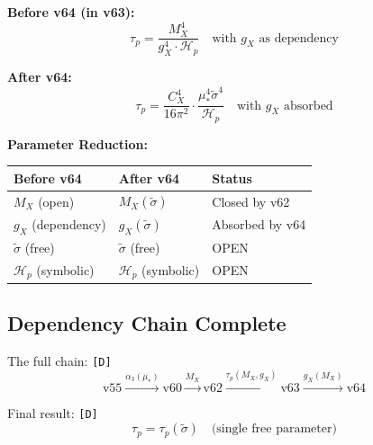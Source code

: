 \documentclass[11pt,a4paper]{article}
\newcommand{\tagD}{\textcolor{green!50!black}{\texttt{[D]}}}
\theoremstyle{definition}
\begin{document}
\begin{canonbox}
\textbf{Before v64 (in v63):}
\begin{equation}
\label{eq:before-v64}
\tau_p = \frac{M_X^4}{g_X^4 \cdot \mathcal{H}_p} \quad \text{with } g_X \text{ as dependency}
\end{equation}

\textbf{After v64:}
\begin{equation}
\label{eq:after-v64}
\tau_p = \frac{C_X^4}{16\pi^2} \cdot \frac{\mu_*^4 \tilde{\sigma}^4}{\mathcal{H}_p} \quad \text{with } g_X \text{ absorbed}
\end{equation}

\textbf{Parameter Reduction:}
\begin{center}
\begin{tabular}{lll}
\toprule
Before v64 & After v64 & Status \\
\midrule
$M_X$ (open) & $M_X(\tilde{\sigma})$ & Closed by v62 \\
$g_X$ (dependency) & $g_X(\tilde{\sigma})$ & Absorbed by v64 \\
$\tilde{\sigma}$ (free) & $\tilde{\sigma}$ (free) & OPEN \\
$\mathcal{H}_p$ (symbolic) & $\mathcal{H}_p$ (symbolic) & OPEN \\
\bottomrule
\end{tabular}
\end{center}
\end{canonbox}

\subsection{Dependency Chain Complete}
\label{subsec:chain-complete}

The full chain: \tagD{}
\begin{equation}
\label{eq:full-chain}
\text{v55} \xrightarrow{\alpha_3(\mu_*)} \text{v60} \xrightarrow{M_X} \text{v62}
\xrightarrow{\tau_p(M_X,g_X)} \text{v63} \xrightarrow{g_X(M_X)} \text{v64}
\end{equation}

Final result: \tagD{}
\begin{equation}
\label{eq:final-result}
\tau_p = \tau_p(\tilde{\sigma}) \quad \text{(single free parameter)}
\end{equation}

\end{document}
